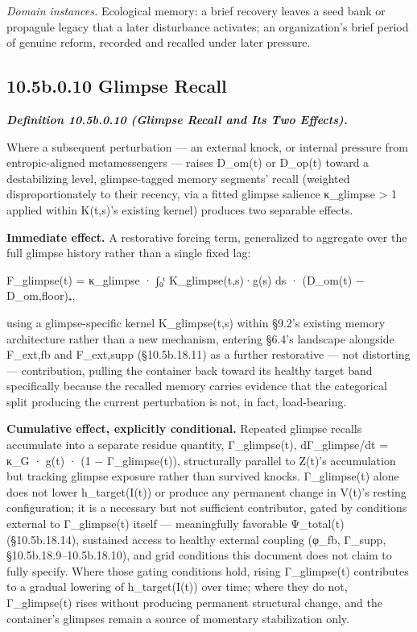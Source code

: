 \documentclass[
]{article}
\begin{document}
\emph{Domain instances.} Ecological memory: a brief recovery leaves a
seed bank or propagule legacy that a later disturbance activates; an
organization's brief period of genuine reform, recorded and recalled
under later pressure.

\hypertarget{b.0.10-glimpse-recall}{%
\subsection{10.5b.0.10 Glimpse Recall}\label{b.0.10-glimpse-recall}}

\emph{\textbf{Definition 10.5b.0.10 (Glimpse Recall and Its Two
Effects).}}

Where a subsequent perturbation --- an external knock, or internal
pressure from entropic-aligned metamessengers --- raises D\_om(t) or
D\_op(t) toward a destabilizing level, glimpse-tagged memory segments'
recall (weighted disproportionately to their recency, via a fitted
glimpse salience κ\_glimpse \textgreater{} 1 applied within K(t,s)'s
existing kernel) produces two separable effects.

\textbf{Immediate effect.} A restorative forcing term, generalized to
aggregate over the full glimpse history rather than a single fixed lag:

F\_glimpse(t) = κ\_glimpse · ∫₀ᵗ K\_glimpse(t,s)·g(s) ds · (D\_om(t) −
D\_om,floor)₊,

using a glimpse-specific kernel K\_glimpse(t,s) within §9.2's existing
memory architecture rather than a new mechanism, entering §6.4's
landscape alongside F\_ext,fb and F\_ext,supp (§10.5b.18.11) as a
further restorative --- not distorting --- contribution, pulling the
container back toward its healthy target band specifically because the
recalled memory carries evidence that the categorical split producing
the current perturbation is not, in fact, load-bearing.

\textbf{Cumulative effect, explicitly conditional.} Repeated glimpse
recalls accumulate into a separate residue quantity, Γ\_glimpse(t),
dΓ\_glimpse/dt = κ\_G · g(t) · (1 − Γ\_glimpse(t)), structurally
parallel to Z(t)'s accumulation but tracking glimpse exposure rather
than survived knocks. Γ\_glimpse(t) alone does not lower h\_target(I(t))
or produce any permanent change in V(t)'s resting configuration; it is a
necessary but not sufficient contributor, gated by conditions external
to Γ\_glimpse(t) itself --- meaningfully favorable Ψ\_total(t)
(§10.5b.18.14), sustained access to healthy external coupling (φ\_fb,
Γ\_supp, §10.5b.18.9--10.5b.18.10), and grid conditions this document
does not claim to fully specify. Where those gating conditions hold,
rising Γ\_glimpse(t) contributes to a gradual lowering of
h\_target(I(t)) over time; where they do not, Γ\_glimpse(t) rises
without producing permanent structural change, and the container's
glimpses remain a source of momentary stabilization only.
\end{document}
